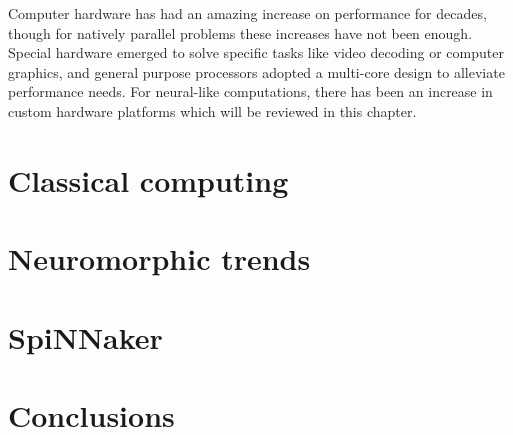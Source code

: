 Computer hardware has had an amazing increase on performance for decades, though for natively parallel problems these increases have not been enough. Special hardware emerged to solve specific tasks like video decoding or computer graphics, and general purpose processors adopted a multi-core design to alleviate performance needs. For neural-like computations, there has been an increase in custom hardware platforms which will be reviewed in this chapter.

\section{Classical computing}

\section{Neuromorphic trends}

\section{SpiNNaker}

%
\section{Conclusions}

